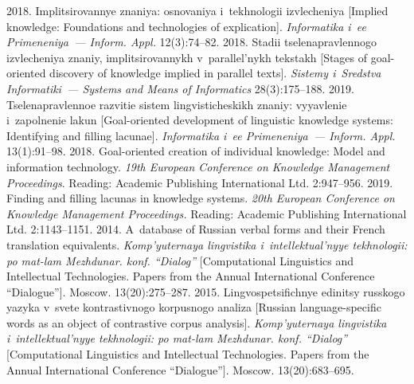 \begin{multicols}{2}
{{\begin{thebibliography}{99}
 2018. Implitsirovannye znaniya: osnovaniya i~tekhnologii izvlecheniya 
[Implied knowledge: Foundations and technologies of explication]. \textit{Informatika i~ee 
Primeneniya~--- Inform. Appl.} 12(3):74--82.
 2018. Stadii tselenapravlennogo izvlecheniya znaniy, implitsirovannykh 
v~parallel'nykh tekstakh [Stages of goal-oriented discovery of knowledge implied in parallel 
texts]. \textit{Sistemy i~Sredstva Informatiki~--- Systems and Means of Informatics} 
28(3):175--188.
 2019. Tselenapravlennoe razvitie sistem lingvisticheskikh znaniy: 
vyyavlenie i~zapolnenie lakun [Goal-oriented development of linguistic knowledge systems: 
Identifying and filling lacunae]. \textit{Informatika i~ee Primeneniya~--- Inform. Appl.} 
13(1):91--98.
 2018. Goal-oriented creation of individual knowledge: Model and 
information technology. \textit{19th European Conference on Knowledge Management 
Proceedings}. Reading: Academic Publishing International Ltd. 2:947--956.
 2019. Finding and filling lacunas in knowledge systems. \textit{20th 
European Conference on Knowledge Management Proceedings.} Reading: Academic Publishing 
International Ltd. 2:1143--1151.
 2014. A~database of Russian verbal forms and their 
French translation equivalents. \textit{Komp'yuternaya lingvistika i~intellektual'nyye tekhnologii: 
po mat-lam Mezhdunar. konf. ``Dialog''} [Computational Linguistics and Intellectual 
Technologies. Papers from the Annual International Conference ``Dialogue'']. Moscow. 
13(20):275--287.
 2015. Lingvospetsifichnye edi\-ni\-tsy russkogo yazyka v~svete 
kontrastivnogo korpusnogo analiza [Russian language-specific words as an object of contrastive 
corpus analysis]. \textit{Komp'yuternaya lingvistika i~intellektual'nyye tekhnologii: po mat-lam 
Mezhdunar. konf. ``Dialog''} [Computational Linguistics and Intellectual Technologies. Papers 
from the Annual International Conference ``Dialogue'']. Moscow. 13(20):683--695.


\end{thebibliography}}}
\end{multicols}
